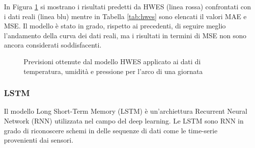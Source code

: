 \documentclass{article}
\begin{document}
In Figura \ref{fig:hwes} si mostrano i risultati predetti da HWES (linea rossa) confrontati con i dati reali (linea blu) mentre in Tabella \ref{tab:hwes} sono elencati il valori MAE e MSE. Il modello è stato in grado, rispetto ai precedenti, di seguire meglio l'andamento della curva dei dati reali, ma i risultati in termini di MSE non sono ancora considerati soddisfacenti.


\begin{figure}
    \centering
    \qquad
    \qquad
    \caption{Previsioni ottenute dal modello HWES applicato ai dati di temperatura, umidità e pressione per l'arco di una giornata}
    \label{fig:hwes}
\end{figure}


\subsubsection{LSTM\label{sec:lstm}} 
Il modello Long Short-Term Memory (LSTM) è un'archiettura Recurrent Neural Network (RNN) utilizzata nel campo del deep learning. Le LSTM sono RNN in grado di riconoscere schemi in delle sequenze di dati come le time-serie provenienti dai sensori.
\end{document}
